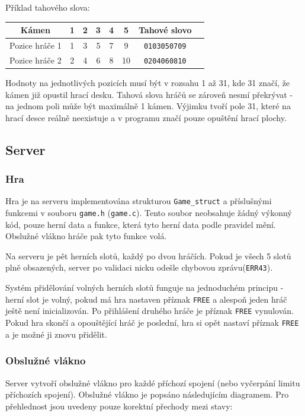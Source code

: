 \documentclass[11pt,a4paper]{scrartcl}
\begin{document}
	Příklad tahového slova:
	
	\begin{center}
		\begin{tabular} {| c || c | c | c | c | c | c | c}
			\hline
			Kámen & 1 & 2 & 3 & 4 & 5 & Tahové slovo\\
			\hline
			\hline
			Pozice hráče 1 & 1& 3& 5& 7& 9 & \verb|0103050709|\\
			\hline
			\hline
			Pozice hráče 2 & 2& 4& 6& 8& 10& \verb|0204060810|\\
						
			\hline
		\end{tabular}
	
	\end{center}
	
	Hodnoty na jednotlivých pozicích musí být v rozsahu 1 až 31, kde 31 značí, že kámen již opustil hrací desku. Tahová slova hráčů se zároveň nesmí překrývat - na jednom poli může být maximálně 1 kámen. Výjimku tvoří pole 31, které na hrací desce reálně neexistuje a v programu značí pouze opuštění hrací plochy.
	
		
	\subsection{Server}
	
	
	\subsubsection{Hra}
	
	Hra je na serveru implementována strukturou \verb|Game_struct| a příslušnými funkcemi v souboru \verb|game.h| (\verb|game.c|). Tento soubor neobsahuje žádný výkonný kód, pouze herní data a funkce, která tyto herní data podle pravidel mění. Obslužné vlákno hráče pak tyto funkce volá.
	
	Na serveru je pět herních slotů, každý po dvou hráčích. Pokud je všech 5 slotů plně obsazených, server po validaci nicku odešle chybovou zprávu(\verb|ERR43|).
	
	Systém přidělování volných herních slotů funguje na jednoduchém principu - herní slot je volný, pokud má hra nastaven příznak \verb|FREE| a alespoň jeden hráč ještě není inicializován. Po přihlášení druhého hráče je příznak \verb|FREE| vynulován. Pokud hra skončí a opouštějící hráč je poslední, hra si opět nastaví příznak \verb|FREE| a je možné ji znovu přidělit.
	
	\subsubsection{Obslužné vlákno}
	Server vytvoří obslužné vlákno pro každé příchozí spojení (nebo vyčerpání limitu příchozích spojení). Obslužné vlákno je popsáno následujícím diagramem. Pro přehlednost jsou uvedeny pouze korektní přechody mezi stavy:
	
\end{document}
